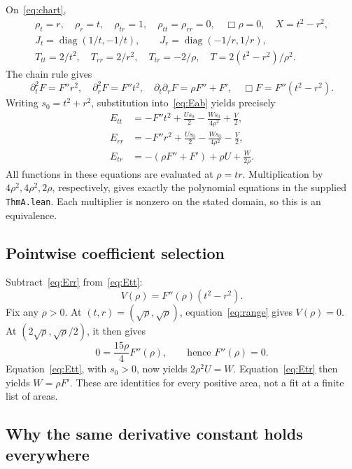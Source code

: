 \documentclass[11pt]{article}
\begin{document}
On~\eqref{eq:chart},
\begin{gather}
 \rho_t=r,\quad \rho_r=t,\quad \rho_{tr}=1,\quad \rho_{tt}=\rho_{rr}=0,
 \quad \Box\rho=0,\quad X=t^2-r^2,\\
 J_t=\operatorname{diag}(1/t,-1/t),\qquad J_r=\operatorname{diag}(-1/r,1/r),\\
 T_{tt}=2/t^2,\quad T_{rr}=2/r^2,\quad T_{tr}=-2/\rho,
 \quad T=2(t^2-r^2)/\rho^2.
\end{gather}
The chain rule gives
\begin{equation}
 \partial_t^2F=F''r^2,\quad \partial_r^2F=F''t^2,\quad
 \partial_t\partial_rF=\rho F''+F',\quad \Box F=F''(t^2-r^2).
\end{equation}
Writing $s_0=t^2+r^2$, substitution into~\eqref{eq:Eab} yields precisely
\begin{align}
 E_{tt}&=-F''t^2+\frac{Us_0}{2}-\frac{Ws_0}{4\rho^2}+\frac V2,\label{eq:Ett}\\
 E_{rr}&=-F''r^2+\frac{Us_0}{2}-\frac{Ws_0}{4\rho^2}-\frac V2,\label{eq:Err}\\
 E_{tr}&=-(\rho F''+F')+\rho U+\frac W{2\rho}.\label{eq:Etr}
\end{align}
All functions in these equations are evaluated at $\rho=tr$. Multiplication by $4\rho^2,4\rho^2,2\rho$, respectively, gives exactly the polynomial equations in the supplied \texttt{ThmA.lean}. Each multiplier is nonzero on the stated domain, so this is an equivalence.

\subsection{Pointwise coefficient selection}

Subtract~\eqref{eq:Err} from~\eqref{eq:Ett}:
\begin{equation}\label{eq:range}
 V(\rho)=F''(\rho)(t^2-r^2).
\end{equation}
Fix any $\rho>0$. At $(t,r)=(\sqrt\rho,\sqrt\rho)$, equation~\eqref{eq:range} gives $V(\rho)=0$. At $(2\sqrt\rho,\sqrt\rho/2)$, it then gives
\begin{equation}
 0=\frac{15\rho}{4}F''(\rho),\qquad\text{hence }F''(\rho)=0.
\end{equation}
Equation~\eqref{eq:Ett}, with $s_0>0$, now yields $2\rho^2U=W$. Equation~\eqref{eq:Etr} then yields $W=\rho F'$. These are identities for every positive area, not a fit at a finite list of areas.

\subsection{Why the same derivative constant holds everywhere}
\end{document}
